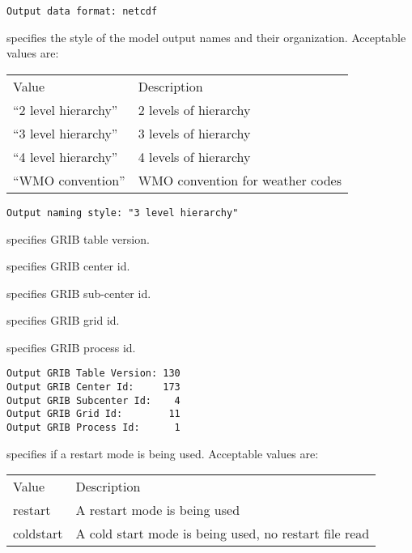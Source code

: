  \begin{Verbatim}[frame=single]
Output data format: netcdf
 \end{Verbatim}

 
  specifies the style of the model output
 names and their organization.
 Acceptable values are:

 \begin{tabular}{ll}
 Value                 & Description                       \\
 ``2 level hierarchy'' & 2 levels of hierarchy             \\
 ``3 level hierarchy'' & 3 levels of hierarchy             \\
 ``4 level hierarchy'' & 4 levels of hierarchy             \\
 ``WMO convention''    & WMO convention for weather codes  \\
 \end{tabular}
 

 \begin{Verbatim}[frame=single]
Output naming style: "3 level hierarchy"
 \end{Verbatim}

 
  specifies GRIB table version.

  specifies GRIB center id.

  specifies GRIB sub-center id.

  specifies GRIB grid id.

  specifies GRIB process id.

 

 \begin{Verbatim}[frame=single]
Output GRIB Table Version: 130
Output GRIB Center Id:     173
Output GRIB Subcenter Id:    4
Output GRIB Grid Id:        11
Output GRIB Process Id:      1
 \end{Verbatim}


 
  specifies if a restart mode is being used. 
 Acceptable values are:

 \begin{tabular}{ll}
 Value     & Description                                           \\
 restart   & A restart mode is being used                          \\
 coldstart & A cold start mode is being used, no restart file read \\
 \end{tabular}


